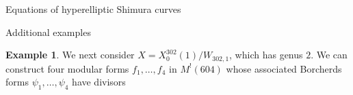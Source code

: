\documentclass{amsart}
\newcounter{lemma}
\theoremstyle{definition}
\newtheorem{Example}[lemma]{Example}
\begin{document}
\begin{section}{Equations of hyperelliptic Shimura curves}
\begin{subsection}{Additional examples}
\begin{Example} \label{example: 302}
  We next consider $X=X_0^{302}(1)/W_{302,1}$, which has genus
  $2$. We can construct four modular forms $f_1,\ldots,f_4$ in
  $M^!(604)$ whose associated Borcherds forms $\psi_1,\ldots,\psi_4$
  have divisors

\end{Example}
\end{subsection}
\end{section}
\end{document}
